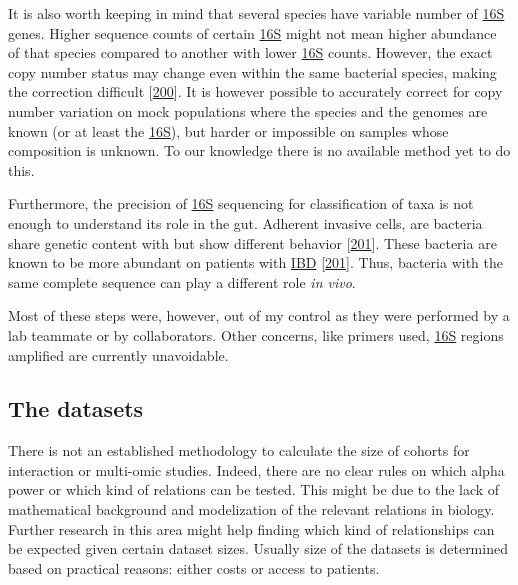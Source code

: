 \documentclass[
  12pt,
  a4paper,
  twoside,
  openright]{book}
\begin{document}
It is also worth keeping in mind that several species have variable number of \protect\hyperlink{acronyms_16S}{16S} genes.
Higher sequence counts of certain \protect\hyperlink{acronyms_16S}{16S} might not mean higher abundance of that species compared to another with lower \protect\hyperlink{acronyms_16S}{16S} counts.
However, the exact copy number status may change even within the same bacterial species, making the correction difficult {[}\protect\hyperlink{ref-louca2018}{200}{]}.
It is however possible to accurately correct for copy number variation on mock populations where the species and the genomes are known (or at least the \protect\hyperlink{acronyms_16S}{16S}), but harder or impossible on samples whose composition is unknown.
To our knowledge there is no available method yet to do this.

Furthermore, the precision of \protect\hyperlink{acronyms_16S}{16S} sequencing for classification of taxa is not enough to understand its role in the gut.
Adherent invasive cells, are bacteria share genetic content with but show different behavior {[}\protect\hyperlink{ref-nadalian2021}{201}{]}.
These bacteria are known to be more abundant on patients with \protect\hyperlink{acronyms_IBD}{IBD} {[}\protect\hyperlink{ref-nadalian2021}{201}{]}.
Thus, bacteria with the same complete sequence can play a different role \emph{in vivo}.

Most of these steps were, however, out of my control as they were performed by a lab teammate or by collaborators.
Other concerns, like primers used, \protect\hyperlink{acronyms_16S}{16S} regions amplified are currently unavoidable.

\hypertarget{discussion-datasets}{%
\subsection{The datasets}\label{discussion-datasets}}

There is not an established methodology to calculate the size of cohorts for interaction or multi-omic studies.
Indeed, there are no clear rules on which alpha power or which kind of relations can be tested.
This might be due to the lack of mathematical background and modelization of the relevant relations in biology.
Further research in this area might help finding which kind of relationships can be expected given certain dataset sizes.
Usually size of the datasets is determined based on practical reasons: either costs or access to patients.
\end{document}
